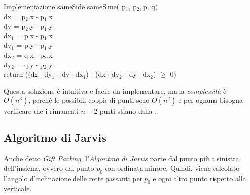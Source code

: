 \begin{minicode}{Implementazione sameSide}
\ind{} sameSime( p$_1$,  p$_2$,  p,  q)\\
     dx = p$_2$.x - p$_1$.x\\
     dy = p$_2$.y - p$_1$.y\\
     dx$_1$ = p.x - p$_1$.x\\
     dy$_1$ = p.y - p$_1$.y\\
     dx$_2$ = q.x - p$_2$.x\\
     dy$_2$ = q.y - p$_2$.y\\
    return ((dx $\cdot$ dy$_1$ - dy $\cdot$ dx$_1$) $\cdot$
    (dx $\cdot$ dy$_2$ - dy $\cdot$ dx$_2$) $\geq$ 0)
\end{minicode}

\noindent
Questa soluzione è intuitiva e facile da implementare, ma la \emph{complessità}
è $O(n^3)$, perché le possibili coppie di punti sono $O(n^2)$ e per ognuna bisogna
verificare che i rimanenti $n-2$ punti stiano dalla .

\subsection{Algoritmo di Jarvis}
Anche detto \emph{Gift Packing}, l'\emph{Algoritmo di Jarvis} parte dal punto
più a sinistra dell'insieme, ovvero dal punto $p_0$ con ordinata minore. Quindi,
viene calcolato l'angolo d'inclinazione delle rette passanti per $p_0$ e
ogni altro punto rispetto alla verticale. 

